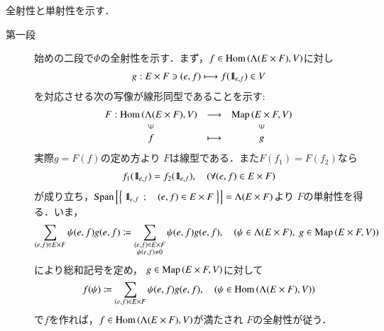 	\begin{prf}全射性と単射性を示す．
		\begin{description}
			\item[第一段]
				始めの二段で$\Phi$の全射性を示す．まず，$f \in \mathrm{Hom} \left(\Lambda(E \times F),V\right)$に対し
				\begin{align}
					g: E \times F \ni (e,f) \longmapsto f(\mbox{1}\hspace{-0.25em}\mbox{l}_{e,f}) \in V
				\end{align}
				を対応させる次の写像が線形同型であることを示す:
				\begin{align}
					\begin{array}{ccc}
						F:\Hom{\Lambda(E \times F)}{V} & \longrightarrow & \Map{E \times F}{V} \\
						\rotatebox{90}{$\in$} & & \rotatebox{90}{$\in$} \\
						f & \longmapsto & g
					\end{array}
				\end{align}
				実際$g = F(f)$の定め方より
				$F$は線型である．また$F(f_1) = F(f_2)$なら
				\begin{align}
					f_1(\mbox{1}\hspace{-0.25em}\mbox{l}_{e,f}) = f_2(\mbox{1}\hspace{-0.25em}\mbox{l}_{e,f}),
					\quad (\forall (e,f) \in E \times F)
				\end{align}
				が成り立ち，$\mathrm{Span}\left[ \left\{\ \mbox{1}\hspace{-0.25em}\mbox{l}_{e,f}\ \, ; \quad (e,f) \in E \times F\ \right\} \right]=\Lambda(E \times F)$より
				$F$の単射性を得る．いま，
				\begin{align}
					\sum_{(e,f) \in E \times F} \psi(e,f) g(e,f)
					\coloneqq \sum_{\substack{(e,f) \in E \times F \\ \psi(e,f) \neq 0}} \psi(e,f) g(e,f),
					\quad (\psi \in \Lambda(E \times F),\ g \in \mathrm{Map} \left(E \times F,V\right))
				\end{align}
				により総和記号を定め，
				$g \in \mathrm{Map} \left(E \times F,V\right)$に対して
				\begin{align}
					f(\psi) \coloneqq \sum_{(e,f) \in E \times F} \psi(e,f) g(e,f),
					\quad (\psi \in \mathrm{Hom} \left(\Lambda(E \times F),V\right))
				\end{align}
				で$f$を作れば，$f \in \mathrm{Hom} \left(\Lambda(E \times F),V\right)$が満たされ
				$F$の全射性が従う．
				

\end{description}
\end{prf}
